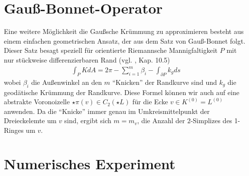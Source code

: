 \section{Gauß-Bonnet-Operator}
  Eine weitere Möglichkeit die Gaußsche Krümmung zu approximieren besteht aus einem einfachen geometrischen Ansatz, der aus dem Satz von
  Gauß-Bonnet folgt. 
  Dieser Satz besagt speziell für orientierte Riemannsche Mannigfaltigkeit \( P \) mit nur stückweise differenzierbaren Rand (vgl.
  \cite{berger}, Kap. 10.5)
  \begin{align}
    \int_{P}K dA = 2\pi - \sum_{i=1}^{m}\beta_{i} - \int_{\partial P} k_{g} ds
  \end{align}
  wobei \( \beta_{i} \) die Außenwinkel an den \( m \) "`Knicken"' der Randkurve sind und \( k_{g} \) die geodätische Krümmung der
  Randkurve.
  Diese Formel können wir auch auf eine abstrakte Voronoizelle \( \star\pi(v)\in C_{2}(\star L) \) für die Ecke \( v \in K^{(0)}=L^{(0)} \)
  anwenden. 
  Da die "`Knicke"' immer genau im Umkreismittelpunkt der Dreieckelemte um \( v \) sind, 
  ergibt sich \( m=m_{v} \), die Anzahl der \( 2 \)-Simplizes des 1-Ringes um \( v \).


\section{Numerisches Experiment}
\label{secNumEx}
  
